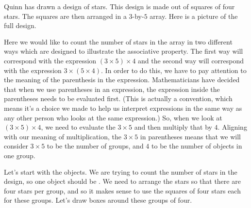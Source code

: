 \documentclass{ximera}
\begin{document}
\begin{example}
Quinn has drawn a design of stars. This design is made out of squares of four stars. The squares are then arranged in a $3$-by-$5$ array. Here is a picture of the full design.
\begin{image}
\end{image}

Here we would like to count the number of stars in the array in two different ways which are designed to illustrate the associative property. The first way will correspond with the expression $(3 \times 5) \times 4$ and the second way will correspond with the expression $3 \times (5 \times 4)$. In order to do this, we have to pay attention to the meaning of the parenthesis in the expression. Mathematicians have decided that when we use parentheses in an expression, the expression inside the parentheses needs to be evaluated first. (This is actually a convention, which means it's a choice we made to help us interpret expressions in the same way as any other person who looks at the same expression.) So, when we look at $(3 \times 5) \times 4$, we need to evaluate the $3 \times 5$ and then multiply that by $4$. Aligning with our meaning of multiplication, the $3 \times 5$ in parentheses means that we will consider $3 \times 5$ to be the number of groups, and $4$ to be the number of objects in one group. 

Let's start with the objects. We are trying to count the number of stars in the design, so one object should be . We need to arrange the stars so that there are four stars per group, and so it makes sense to use the squares of four stars each for these groups. Let's draw boxes around these groups of four.
\begin{image}
\end{image}


\end{example}
\end{document}
